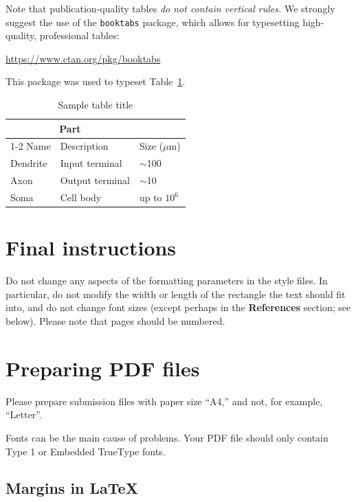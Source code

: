 \documentclass[a4paper]{article}
\begin{document}
Note that publication-quality tables \emph{do not contain vertical rules.} We
strongly suggest the use of the \verb+booktabs+ package, which allows for
typesetting high-quality, professional tables:
\begin{center}
  \url{https://www.ctan.org/pkg/booktabs}
\end{center}
This package was used to typeset Table~\ref{sample-table}.


\begin{table}
  \caption{Sample table title}
  \label{sample-table}
  \centering
  \begin{tabular}{lll}
    \toprule
    \multicolumn{2}{c}{Part}                   \\
    \cmidrule(r){1-2}
    Name     & Description     & Size ($\mu$m) \\
    \midrule
    Dendrite & Input terminal  & $\sim$100     \\
    Axon     & Output terminal & $\sim$10      \\
    Soma     & Cell body       & up to $10^6$  \\
    \bottomrule
  \end{tabular}
\end{table}


\section{Final instructions}


Do not change any aspects of the formatting parameters in the style files.  In
particular, do not modify the width or length of the rectangle the text should
fit into, and do not change font sizes (except perhaps in the
\textbf{References} section; see below). Please note that pages should be
numbered.


\section{Preparing PDF files}


Please prepare submission files with paper size ``A4,'' and not, for
example, ``Letter''.


Fonts can be the main cause of problems. Your PDF file should only
contain Type 1 or Embedded TrueType fonts.



\subsection{Margins in \LaTeX{}}
\end{document}
